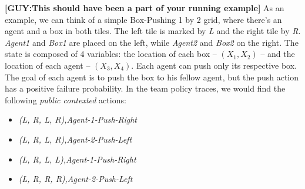 \documentclass[letterpaper]{article} %
\newcommand{\eliran}[1]{\textbf{[\color{red}ELIRAN:#1]}}
\newcommand{\ronen}[1]{\textbf{[\color{blue}RONEN:#1]}}
\newcommand{\guy}[1]{\textbf{[\color{orange}GUY:#1]}}
\begin{document}




\guy{This should have been a part of your running example}
As an example, we can think of a simple Box-Pushing 1 by 2 grid, where there's an agent and a box in both tiles. The left tile is marked by \emph{L} and the right tile by \emph{R}. \emph{Agent1} and \emph{Box1} are placed on the left, while \emph{Agent2} and \emph{Box2} on the right. The state is composed of 4 variables: the location of each box -- $(X_1, X_2)$ -- and the location of each agent -- $(X_3, X_4)$. Each agent can push only its respective box. The goal of each agent is to push the box to his fellow agent, but the push action has a positive failure probability. In the team policy traces, we would find the following \emph{public contexted} actions:
\begin{itemize}
    \item \emph{(L, R, L, R),Agent-1-Push-Right}
    \item \emph{(L, R, L, R),Agent-2-Push-Left}
    \item \emph{(L, R, L, L),Agent-1-Push-Right}
    \item \emph{(L, R, R, R),Agent-2-Push-Left}
\end{itemize}
\end{document}
